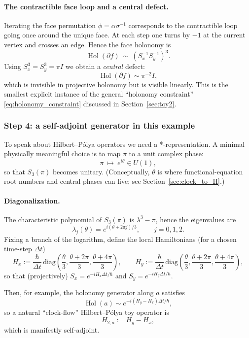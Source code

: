 \documentclass[11pt,oneside]{amsbook}
\numberwithin{equation}{section}
\theoremstyle{plain}
\theoremstyle{definition}
\theoremstyle{remark}
\DeclareMathOperator{\Hol}{\mathrm{Hol}}
\begin{document}
\paragraph{The contractible face loop and a central defect.}
Iterating the face permutation $\phi=\alpha\sigma^{-1}$ corresponds to the contractible loop going once around the unique face.
At each step one turns by $-1$ at the current vertex and crosses an edge.
Hence the face holonomy is
\begin{equation}
\label{eq:torus_face_holonomy}
\Hol(\partial f)\ \sim\ (S_x^{-1}S_y^{-1})^{3}.
\end{equation}
Using $S_x^3=S_y^3=\pi I$ we obtain a \emph{central} defect:
\[
\Hol(\partial f)\sim \pi^{-2} I,
\]
which is invisible in projective holonomy but is visible linearly.
This is the smallest explicit instance of the general ``holonomy constraint'' \eqref{eq:holonomy_constraint} discussed in Section~\ref{sec:toy2}.

\subsubsection{Step 4: a self-adjoint generator in this example}

To speak about Hilbert--Pólya operators we need a *-representation.
A minimal physically meaningful choice is to map $\pi$ to a unit complex phase:
\[
\pi\ \longmapsto\ e^{i\theta}\in U(1),
\]
so that $S_3(\pi)$ becomes unitary.
(Conceptually, $\theta$ is where functional-equation root numbers and central phases can live; see Section~\ref{sec:clock_to_H}.)

\paragraph{Diagonalization.}
The characteristic polynomial of $S_3(\pi)$ is $\lambda^3-\pi$, hence the eigenvalues are
\[
\lambda_j(\theta)=e^{i(\theta+2\pi j)/3},\qquad j=0,1,2.
\]
Fixing a branch of the logarithm, define the local Hamiltonians (for a chosen time-step $\Delta t$)
\[
H_x:=\frac{\hbar}{\Delta t}\,\mathrm{diag}\!\left(\frac{\theta}{3},\frac{\theta+2\pi}{3},\frac{\theta+4\pi}{3}\right),\qquad
H_y:=\frac{\hbar}{\Delta t}\,\mathrm{diag}\!\left(\frac{\theta}{3},\frac{\theta+2\pi}{3},\frac{\theta+4\pi}{3}\right),
\]
so that (projectively) $S_x=e^{-iH_x\Delta t/\hbar}$ and $S_y=e^{-iH_y\Delta t/\hbar}$.

Then, for example, the holonomy generator along $a$ satisfies
\[
\Hol(a)\sim e^{-i(H_y-H_x)\Delta t/\hbar},
\]
so a natural ``clock-flow'' Hilbert--Pólya toy operator is
\[
H_{2,a}:=H_y-H_x,
\]
which is manifestly self-adjoint.
\end{document}
